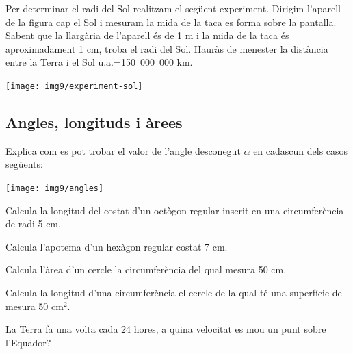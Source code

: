 \begin{activitats}
\begin{mylist}
\item \simbolsearch Per determinar el radi del Sol realitzam el següent experiment. Dirigim l'aparell de la figura cap el Sol i mesuram la mida de la taca es forma sobre la pantalla. Sabent que la llargària de l'aparell és de 1 m i la mida de la taca és aproximadament 1 cm, troba el radi del Sol. Hauràs de menester la distància entre la Terra i el Sol  u.a.=150\, 000\, 000 km. 
\begin{center}
	\texttt{[image: img9/experiment-sol]}
\end{center}
\end{mylist}
 
 


\subsection{Angles, longituds i àrees}

\begin{mylist} 
	
\exer Explica com es pot trobar el valor de l'angle desconegut $\alpha$ en cadascun dels casos següents:

\begin{center}
	\texttt{[image: img9/angles]}
\end{center}

\redacta

\answers{[$\alpha= 180 - (A+180-B)=B-A$, $2A+2\alpha=360$; $\alpha=180-A$]}

\exer  Calcula la longitud del costat d'un octògon regular inscrit en una circumferència de radi 5 cm.


\exer  Calcula l'apotema d'un hexàgon regular costat 7 cm.

\exer  Calcula l'àrea d'un cercle la circumferència del qual mesura 50 cm.

\exer  Calcula la longitud d'una circumferència el cercle de la qual té una superfície de mesura 50 cm${}^{2}$.

\exer  La Terra fa una volta cada 24 hores, a quina velocitat es mou un punt sobre l'Equador?


\end{mylist}
\end{activitats}
